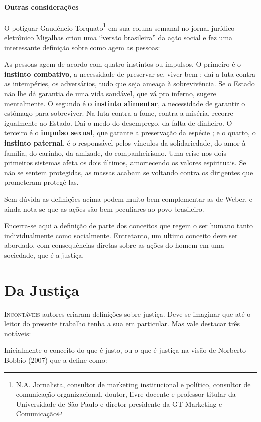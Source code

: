 \documentclass[
	12pt,				%
	openright,			%
	twoside,			%
	a4paper,			%
	chapter=TITLE,		%
	section=TITLE,		%
	subsection=TITLE,	%
	subsubsection=TITLE,%
	spanish,            %
	english,			%
	brazil				%
	]{abntex2}
\begin{document}
\paragraph*{\textbf{Outras considerações}}
O potiguar Gaudêncio Torquato\footnote{N.A. Jornalista, consultor de marketing institucional e político, consultor de comunicação organizacional, doutor, livre-docente e professor titular da Universidade de São Paulo e diretor-presidente da GT Marketing e Comunicação} em sua coluna semanal no jornal jurídico eletrônico Migalhas criou uma “versão brasileira” da ação social e fez uma interessante definição sobre como agem as pessoas:
\begin{citacao}
	As pessoas agem de acordo com quatro instintos ou impulsos. O primeiro é o \textbf{instinto combativo}, a necessidade de preservar-se, viver bem ; daí a luta contra as intempéries, os adversários, tudo que seja ameaça à sobrevivência. Se o Estado não lhe dá garantia de uma vida saudável, que vá pro inferno, sugere mentalmente. O segundo é \textbf{o instinto alimentar}, a necessidade de garantir o estômago para sobreviver. Na luta contra a fome, contra a miséria, recorre igualmente ao Estado. Daí o medo do desemprego, da falta de dinheiro. O terceiro é o \textbf{impulso sexual}, que garante a preservação da espécie ; e o quarto, o \textbf{instinto paternal}, é o responsável pelos vínculos da solidariedade, do amor à família, do carinho, da amizade, do companheirismo. Uma crise nos dois primeiros sistemas afeta os dois últimos, amortecendo os valores espirituais. Se não se sentem protegidas, as massas acabam se voltando contra os dirigentes que prometeram protegê-las.\cite{Migalhas} 
\end{citacao}
\par
Sem dúvida as definições acima podem muito bem complementar as de Weber, e ainda nota-se que as ações são bem peculiares ao povo brasileiro.
\par
Encerra-se aqui a definição de parte dos conceitos que regem o ser humano tanto individualmente como socialmente. Entretanto, um ultimo conceito deve ser abordado, com consequências diretas sobre as ações do homem em uma sociedade, que é a justiça.

\section{Da Justiça}

\lettrine[lines=2, lhang=0.33, loversize=0.25]{I}{ncontáveis} autores criaram definições sobre justiça. Deve-se imaginar que até o leitor do presente trabalho tenha a sua em particular. Mas vale destacar três notáveis:
\par
Inicialmente o conceito do que é justo, ou o que é justiça na visão de
Norberto Bobbio (2007) que a define como:
\end{document}
